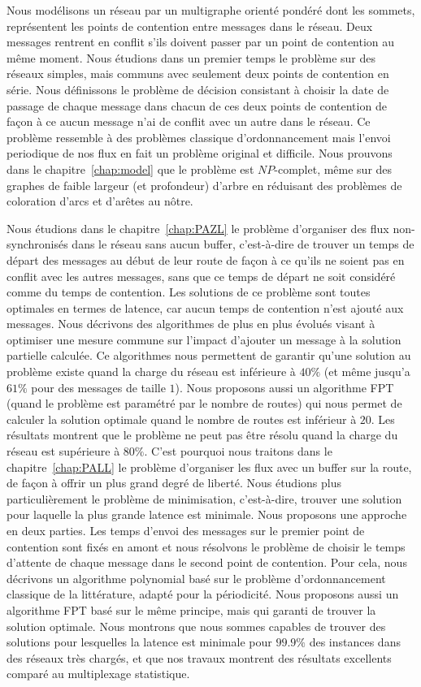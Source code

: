 Nous modélisons un réseau par un multigraphe orienté pondéré dont les sommets, représentent les points de contention entre messages dans le réseau. Deux messages rentrent en conflit s’ils doivent passer par un point de contention au même moment. Nous étudions dans un premier temps le problème sur des réseaux simples, mais communs avec seulement deux points de contention en série. Nous définissons le problème de décision consistant à choisir la date de passage de chaque message dans chacun de ces deux points de contention de façon à ce aucun message n'ai de conflit avec un autre dans le réseau. Ce problème ressemble à des problèmes classique d'ordonnancement mais l'envoi periodique de nos flux en fait un problème original et difficile.
 Nous prouvons dans le chapitre~\ref{chap:model} que le problème est $NP$-complet, même sur des graphes de faible largeur (et profondeur) d'arbre en réduisant des problèmes de coloration d'arcs et d'arêtes au nôtre.


Nous étudions dans le chapitre~\ref{chap:PAZL} le problème d'organiser des flux non-synchronisés dans le réseau sans aucun buffer, c’est-à-dire de trouver un temps de départ des messages au début de leur route de façon à ce qu'ils ne soient pas en conflit avec les autres messages, sans que ce temps de départ ne soit considéré comme du temps de contention. Les solutions de ce problème sont toutes optimales en termes de latence, car aucun temps de contention n'est ajouté aux messages. Nous décrivons des algorithmes de plus en plus évolués visant à optimiser une mesure commune sur l'impact d'ajouter un message à la solution partielle calculée. Ce algorithmes nous permettent de garantir qu'une solution au problème existe quand la charge du réseau est inférieure à $40\%$ (et même jusqu'a $61\%$ pour des messages de taille $1$). Nous proposons aussi un algorithme FPT (quand le problème est paramétré par le nombre de routes) qui nous permet de calculer la solution optimale quand le nombre de routes est inférieur à $20$. Les résultats montrent que le problème ne peut pas être résolu quand la charge du réseau est supérieure à $80\%$.
C'est pourquoi nous traitons dans le chapitre~\ref{chap:PALL} le problème d'organiser les flux avec un buffer sur la route, de façon à offrir un plus grand degré de liberté. Nous étudions plus particulièrement le problème de minimisation, c'est-à-dire, trouver une solution pour laquelle la plus grande latence est minimale. Nous proposons une approche en deux parties. Les temps d'envoi des messages sur le premier point de contention sont fixés en amont et nous résolvons le problème de choisir le temps d'attente de chaque message dans le second point de contention. Pour cela, nous décrivons un algorithme polynomial basé sur le problème d'ordonnancement classique de la littérature, adapté pour la périodicité. Nous proposons aussi un algorithme FPT basé sur le même principe, mais qui garanti de trouver la solution optimale. Nous montrons que nous sommes capables de trouver des solutions pour lesquelles la latence est minimale pour $99.9\%$ des instances dans des réseaux très chargés, et que nos travaux montrent des résultats excellents comparé au multiplexage statistique.

